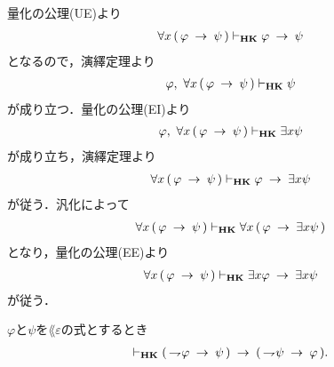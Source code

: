 	\begin{sketch}
		量化の公理(UE)より
		\begin{align}
			\forall x\, (\, \varphi \hspace{0.25em}\rightarrow\hspace{0.25em} \psi\, ) \vdash_{{\scriptsize \mbox{{\bf HK}}}}
			\varphi \hspace{0.25em}\rightarrow\hspace{0.25em} \psi
		\end{align}
		となるので，演繹定理より
		\begin{align}
			\varphi,\ \forall x\, (\, \varphi \hspace{0.25em}\rightarrow\hspace{0.25em} \psi\, ) 
			\vdash_{{\scriptsize \mbox{{\bf HK}}}} \psi
		\end{align}
		が成り立つ．量化の公理(EI)より
		\begin{align}
			\varphi,\ \forall x\, (\, \varphi \hspace{0.25em}\rightarrow\hspace{0.25em} \psi\, ) 
			\vdash_{{\scriptsize \mbox{{\bf HK}}}} \exists x \psi
		\end{align}
		が成り立ち，演繹定理より
		\begin{align}
			\forall x\, (\, \varphi \hspace{0.25em}\rightarrow\hspace{0.25em} \psi\, ) 
			\vdash_{{\scriptsize \mbox{{\bf HK}}}} \varphi \hspace{0.25em}\rightarrow\hspace{0.25em} \exists x \psi
		\end{align}
		が従う．汎化によって
		\begin{align}
			\forall x\, (\, \varphi \hspace{0.25em}\rightarrow\hspace{0.25em} \psi\, ) \vdash_{{\scriptsize \mbox{{\bf HK}}}} 
			\forall x\, (\, \varphi \hspace{0.25em}\rightarrow\hspace{0.25em} \exists x \psi\, )
		\end{align}
		となり，量化の公理(EE)より
		\begin{align}
			\forall x\, (\, \varphi \hspace{0.25em}\rightarrow\hspace{0.25em} \psi\, ) \vdash_{{\scriptsize \mbox{{\bf HK}}}} 
			\exists x \varphi \hspace{0.25em}\rightarrow\hspace{0.25em} \exists x \psi
		\end{align}
		が従う．
		\QED
	\end{sketch}
	
	\begin{screen}
		\begin{thm}[対偶律3]\label{classic:contraposition_3}
			$\varphi$と$\psi$を$\lang{\varepsilon}$の式とするとき
			\begin{align}
				\vdash_{{\scriptsize \mbox{{\bf HK}}}} (\, \rightharpoondown\hspace{-0.25em} \varphi \hspace{0.25em}\rightarrow\hspace{0.25em} \psi\, )
				\hspace{0.25em}\rightarrow\hspace{0.25em} (\, \rightharpoondown\hspace{-0.25em} \psi \hspace{0.25em}\rightarrow\hspace{0.25em} \varphi\, ).
			\end{align}
		\end{thm}
	\end{screen}
	
